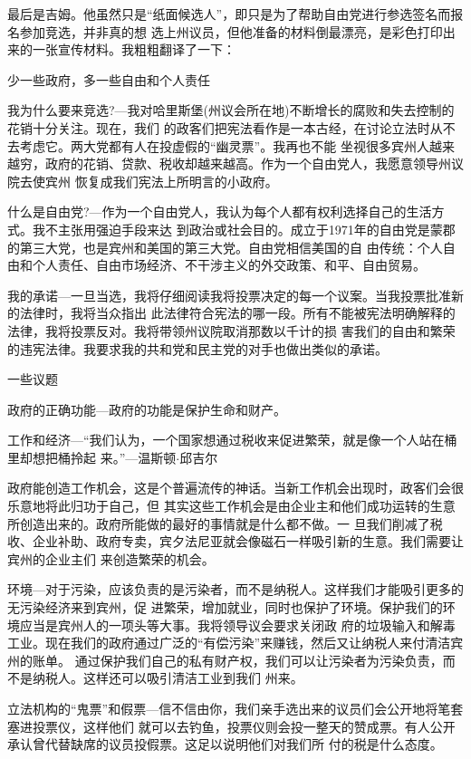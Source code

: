﻿\documentclass[11pt]{article}
\begin{document}
最后是吉姆。他虽然只是``纸面候选人''，即只是为了帮助自由党进行参选签名而报名参加竞选，并非真的想
选上州议员，但他准备的材料倒最漂亮，是彩色打印出来的一张宣传材料。我粗粗翻译了一下：

少一些政府，多一些自由和个人责任

我为什么要来竞选?---我对哈里斯堡(州议会所在地)不断增长的腐败和失去控制的花销十分关注。现在，我们
的政客们把宪法看作是一本古经，在讨论立法时从不去考虑它。两大党都有人在投虚假的``幽灵票''。我再也不能
坐视很多宾州人越来越穷，政府的花销、贷款、税收却越来越高。作为一个自由党人，我愿意领导州议院去使宾州
恢复成我们宪法上所明言的小政府。

什么是自由党?---作为一个自由党人，我认为每个人都有权利选择自己的生活方式。我不主张用强迫手段来达
到政治或社会目的。成立于1971年的自由党是蒙郡的第三大党，也是宾州和美国的第三大党。自由党相信美国的自
由传统：个人自由和个人责任、自由市场经济、不干涉主义的外交政策、和平、自由贸易。


我的承诺---一旦当选，我将仔细阅读我将投票决定的每一个议案。当我投票批准新的法律时，我将当众指出
此法律符合宪法的哪一段。所有不能被宪法明确解释的法律，我将投票反对。我将带领州议院取消那数以千计的损
害我们的自由和繁荣的违宪法律。我要求我的共和党和民主党的对手也做出类似的承诺。

一些议题

政府的正确功能---政府的功能是保护生命和财产。

工作和经济---``我们认为，一个国家想通过税收来促进繁荣，就是像一个人站在桶里却想把桶拎起
来。''---温斯顿$\cdot$邱吉尔

政府能创造工作机会，这是个普遍流传的神话。当新工作机会出现时，政客们会很乐意地将此归功于自己，但
其实这些工作机会是由企业主和他们成功运转的生意所创造出来的。政府所能做的最好的事情就是什么都不做。一
旦我们削减了税收、企业补助、政府专卖，宾夕法尼亚就会像磁石一样吸引新的生意。我们需要让宾州的企业主们
来创造繁荣的机会。

环境---对于污染，应该负责的是污染者，而不是纳税人。这样我们才能吸引更多的无污染经济来到宾州，促
进繁荣，增加就业，同时也保护了环境。保护我们的环境应当是宾州人的一项头等大事。我将领导议会要求关闭政
府的垃圾输入和解毒工业。现在我们的政府通过广泛的``有偿污染''来赚钱，然后又让纳税人来付清洁宾州的账单。
通过保护我们自己的私有财产权，我们可以让污染者为污染负责，而不是纳税人。这样还可以吸引清洁工业到我们
州来。

立法机构的``鬼票''和假票---信不信由你，我们亲手选出来的议员们会公开地将笔套塞进投票仪，这样他们
就可以去钓鱼，投票仪则会投一整天的赞成票。有人公开承认曾代替缺席的议员投假票。这足以说明他们对我们所
付的税是什么态度。
\end{document}
